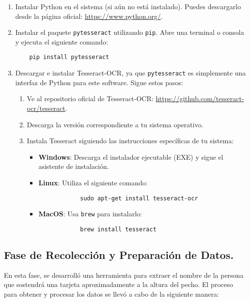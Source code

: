 \documentclass[12pt, letterpaper]{article}
\begin{document}
\begin{enumerate}
    \item Instalar Python en el sistema (si aún no está instalado). Puedes descargarlo desde la página oficial: \url{https://www.python.org/}.
    \item Instalar el paquete \texttt{pytesseract} utilizando \texttt{pip}. Abre una terminal o consola y ejecuta el siguiente comando:
    \begin{verbatim}
    pip install pytesseract
    \end{verbatim}
    \item Descargar e instalar Tesseract-OCR, ya que \texttt{pytesseract} es simplemente una interfaz de Python para este software. Sigue estos pasos:
    \begin{enumerate}
        \item Ve al repositorio oficial de Tesseract-OCR: \url{https://github.com/tesseract-ocr/tesseract}.
        \item Descarga la versión correspondiente a tu sistema operativo.
        \item Instala Tesseract siguiendo las instrucciones específicas de tu sistema:
        \begin{itemize}
            \item \textbf{Windows}: Descarga el instalador ejecutable (EXE) y sigue el asistente de instalación.
            \item \textbf{Linux}: Utiliza el siguiente comando:
            \begin{verbatim}
            sudo apt-get install tesseract-ocr
            \end{verbatim}
            \item \textbf{MacOS}: Usa \texttt{brew} para instalarlo:
            \begin{verbatim}
            brew install tesseract
            \end{verbatim}
        \end{itemize}
    \end{enumerate}
\end{enumerate}

\subsection{Fase de Recolección y Preparación de Datos.}
En esta fase, se desarrolló una herramienta para extraer el nombre de la persona que sostendrá una tarjeta aproximadamente a la altura del pecho. El proceso para obtener y procesar los datos se llevó a cabo de la siguiente manera:
\end{document}
